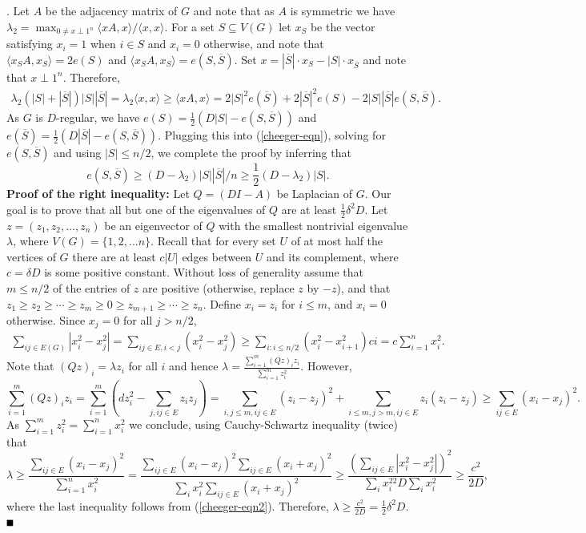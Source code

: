 \documentclass{article}
\newcommand{\bproof}{\noindent{\bf Proof}}
\newcommand{\eproof}{\hspace*{\fill}$\rule{2mm}{2mm}$~~~~\bigskip}
\renewenvironment{proof}{\bproof. }{\eproof}
\begin{document}
\begin{proof} \cite[Theorem 1.1, pp. 324]{ASS2008} Let $A$ be the adjacency matrix of $G$ and note that as $A$ is symmetric we have $\lambda_2=\max_{0\neq x\perp 1^n}\langle xA,x\rangle/\langle x,x\rangle$. For a set $S\subseteq V(G)$ let $x_S$ be the vector satisfying $x_i=1$ when $i\in S$ and $x_i=0$ otherwise, and note that $\langle x_SA,x_S\rangle=2e(S)$ and $\langle x_SA,x_S\rangle=e(S,\overline{S})$. Set $x=|\overline{S}|\cdot x_S-|S|\cdot x_{\overline{S}}$ and note that $x\perp 1^n$. Therefore,
\begin{eqnarray}\label{cheeger-eqn}
\lambda_2(|S|+|\overline{S}|)|S||\overline{S}|=\lambda_2\langle x,x\rangle\geq\langle xA,x\rangle=2|S|^2e(\overline{S})+2|\overline{S}|^2e(S)-2|S||\overline{S}|e(S,\overline{S}).
\end{eqnarray}
As $G$ is $D$-regular, we have $e(S)=\frac{1}{2}(D|S|-e(S,\overline{S}))$ and $e(\overline{S})=\frac{1}{2}(D|\overline{S}|-e(S,\overline{S}))$. Plugging this into (\ref{cheeger-eqn}), solving for $e(S,\overline{S})$ and using $|S|\leq n/2$, we complete the proof by inferring that
\[
e(S,\overline{S})\geq (D-\lambda_2)|S||\overline{S}|/n\geq \frac{1}{2}(D-\lambda_2)|S|.
\]
{\bf Proof of the right inequality:} \cite[Theorem 1.1, pp. 326]{ASS2008} Let $Q=(DI-A)$ be Laplacian of $G$. Our goal is to prove that all but one of the eigenvalues of $Q$ are at least $\frac{1}{2}\delta^2D$. Let $z=(z_1,z_2,\ldots ,z_n)$ be an eigenvector of $Q$ with the smallest nontrivial eigenvalue $\lambda$, where $V(G)=\{1,2,\ldots n\}$. Recall that for every set $U$ of at most half the vertices of $G$ there are at least $c|U|$ edges between $U$ and its complement, where $c=\delta D$ is some positive constant. Without loss of generality assume that $m\leq n/2$ of the entries of $z$ are positive (otherwise, replace $z$ by $-z$), and that $z_1\geq z_2\geq\cdots\geq z_m\geq 0\geq z_{m+1}\geq\cdots \geq z_n$. Define $x_i=z_i$ for $i\leq m$, and $x_i=0$ otherwise. Since $x_j=0$ for all $j> n/2$,
\begin{eqnarray}\label{cheeger-eqn2}
\sum_{ij\in E(G)}|x_i^2-x_j^2|=\sum_{ij\in E,i<j}(x_i^2-x_j^2)\geq \sum_{i:i\leq n/2}(x_i^2-x_{i+1}^2)ci=c\sum_{i=1}^nx_i^2.
\end{eqnarray}
Note that $(Qz)_i=\lambda z_i$ for all $i$ and hence $\lambda =\frac{\sum_{i=1}^m(Qz)_iz_i}{\sum_{i=1}^mz_i^2}$. However,
\[
\sum_{i=1}^m(Qz)_iz_i=\sum_{i=1}^m(dz_i^2-\sum_{j,ij\in E}z_iz_j)=\sum_{i,j\leq m, ij\in E}(z_i-z_j)^2+\sum_{i\leq m,j>m,ij\in E}z_i(z_i-z_j)\geq \sum_{ij\in E}(x_i-x_j)^2.
\]
As $\sum_{i=1}^mz_i^2=\sum_{i=1}^nx_i^2$ we conclude, using Cauchy-Schwartz inequality (twice) that
\[
\lambda\geq\frac{\sum_{ij\in E}(x_i-x_j)^2}{\sum_{i=1}^nx_i^2}=\frac{\sum_{ij\in E}(x_i-x_j)^2\sum_{ij\in E}(x_i+x_j)^2}{\sum_ix_i^2\sum_{ij\in E}(x_i+x_j)^2}\geq \frac{(\sum_{ij\in E}|x_i^2-x_j^2|)^2}{\sum_ix_i^22D\sum_ix_i^2}\geq \frac{c^2}{2D},
\]
where the last inequality follows from (\ref{cheeger-eqn2}). Therefore, $\lambda\geq \frac{c^2}{2D}=\frac{1}{2}\delta^2D$.
\end{proof}
\end{document}
